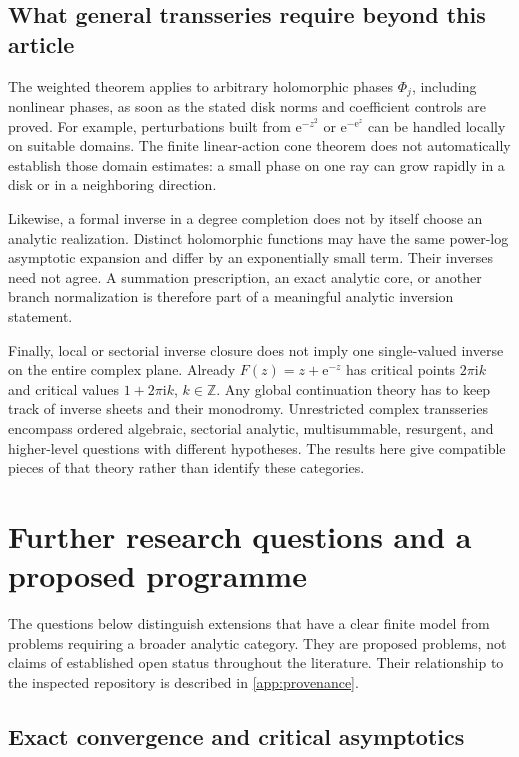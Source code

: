 \documentclass[11pt,a4paper]{article}
\numberwithin{equation}{section}
\theoremstyle{definition}
\theoremstyle{remark}
\newcommand{\Z}{\mathbb Z}
\newcommand{\ii}{\mathrm i}
\newcommand{\e}{\mathrm e}
\begin{document}
\subsection{What general transseries require beyond this article}

The weighted theorem applies to arbitrary holomorphic phases
$\Phi_j$, including nonlinear phases, as soon as the stated disk
norms and coefficient controls are proved.
For example, perturbations built from $\e^{-z^2}$ or
$\e^{-\e^z}$ can be handled locally on suitable domains.
The finite linear-action cone theorem does not automatically
establish those domain estimates: a small phase on one ray can
grow rapidly in a disk or in a neighboring direction.

Likewise, a formal inverse in a degree completion does not by itself
choose an analytic realization. Distinct holomorphic functions may
have the same power-log asymptotic expansion and differ by an
exponentially small term. Their inverses need not agree.
A summation prescription, an exact analytic core, or another branch
normalization is therefore part of a meaningful analytic inversion
statement.

Finally, local or sectorial inverse closure does not imply one
single-valued inverse on the entire complex plane.
Already $F(z)=z+\e^{-z}$ has critical points $2\pi\ii k$ and
critical values $1+2\pi\ii k$, $k\in\Z$.
Any global continuation theory has to keep track of inverse sheets
and their monodromy.
Unrestricted complex transseries encompass ordered algebraic,
sectorial analytic, multisummable, resurgent, and higher-level
questions with different hypotheses.
The results here give compatible pieces of that theory rather
than identify these categories.

\section{Further research questions and a proposed programme}\label{sec:questions}

The questions below distinguish extensions that have a clear finite
model from problems requiring a broader analytic category.
They are proposed problems, not claims of established open status
throughout the literature. Their relationship to the inspected
repository is described in \cref{app:provenance}.

\subsection{Exact convergence and critical asymptotics}
\end{document}
